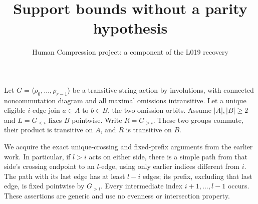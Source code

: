 \documentclass[11pt,a4paper]{article}
\title{Support bounds without a parity hypothesis}
\author{Human Compression project: a component of the L019 recovery}
\date{}
\newcommand{\gen}[1]{\langle#1\rangle}
\begin{document}
\maketitle
Let $G=\gen{\rho_0,\ldots,\rho_{r-1}}$ be a transitive string
action by involutions, with connected noncommutation diagram and
all maximal omissions intransitive. Let a unique eligible
$i$-edge join $a\in A$ to $b\in B$, the two omission orbits.
Assume $|A|,|B|\ge2$ and $L=G_{<i}$ fixes $B$ pointwise.
Write $R=G_{>i}$. These two groups commute, their product is
transitive on $A$, and $R$ is transitive on $B$.

We acquire the exact unique-crossing and fixed-prefix arguments
from the earlier work. In particular, if $l>i$ acts on either
side, there is a simple path from that side's crossing endpoint
to an $l$-edge, using only earlier indices different from $i$.
The path with its last edge has at least $l-i$ edges; its prefix,
excluding that last edge, is fixed pointwise by $G_{>l}$.
Every intermediate index $i+1,\ldots,l-1$ occurs. These assertions
are generic and use no evenness or intersection property.
\end{document}
